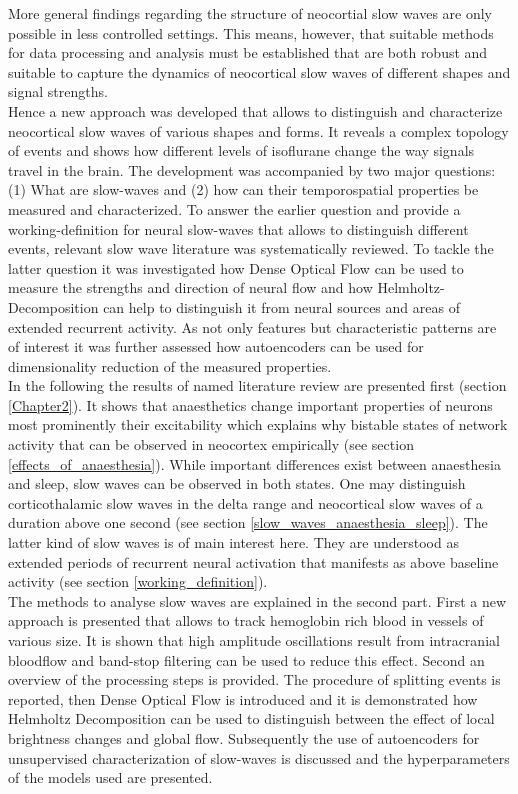 More general findings regarding the structure of neocortial slow waves are only possible in less controlled settings. This means, however, that suitable methods for data processing and analysis must be established that are both robust and suitable to capture the dynamics of neocortical slow waves of different shapes and signal strengths.\\
Hence a new approach was developed that allows to distinguish and characterize neocortical slow waves of various shapes and forms. It reveals a complex topology of events and shows how different levels of isoflurane change the way signals travel in the brain. The development was accompanied by two major questions: (1) What are slow-waves and  (2) how can their temporospatial properties be measured and characterized. To answer the earlier question and provide a working-definition for neural slow-waves that allows to distinguish different events, relevant slow wave literature was systematically reviewed. To tackle the latter question it was investigated how Dense Optical Flow can be used to measure the strengths and direction of neural flow and how Helmholtz-Decomposition can help to distinguish it from neural sources and areas of extended recurrent activity. As not only features but characteristic patterns are of interest it was further assessed how autoencoders can be used for dimensionality reduction of the measured properties.\\
In the following the results of named literature review are presented first (section \ref{Chapter2}). It shows that anaesthetics change important properties of neurons most prominently their excitability which explains why bistable states of network activity that can be observed in neocortex empirically (see section \ref{effects_of_anaesthesia}). While important differences exist between anaesthesia and sleep, slow waves can be observed in both states. One may distinguish corticothalamic slow waves in the delta range and neocortical slow waves of a duration above one second (see section \ref{slow_waves_anaesthesia_sleep}). The latter kind of slow waves is of main interest here. They are understood as extended periods of recurrent neural activation that manifests as above baseline activity (see section \ref{working_definition}). \\
The methods to analyse slow waves are explained in the second part. First a new approach is presented that allows to track hemoglobin rich blood in vessels of various size. It is shown that high amplitude oscillations result from intracranial bloodflow and band-stop filtering can be used to reduce this effect. Second an overview of the processing steps is provided. The procedure of splitting events is reported, then Dense Optical Flow is introduced and it is demonstrated how Helmholtz Decomposition can be used to distinguish between the effect of local brightness changes and global flow. Subsequently the use of autoencoders for unsupervised characterization of slow-waves is discussed and the hyperparameters of the models used are presented. \\
